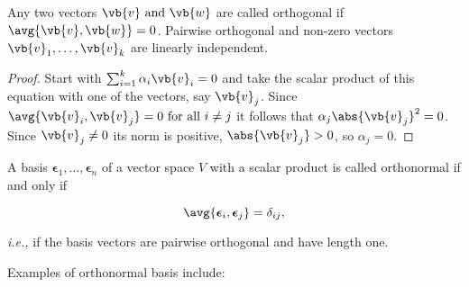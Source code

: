 \documentclass[a4paper,12pt]{report}
\begin{document}
\begin{lemma}
Any two vectors \(\vb{v} \text { and } \vb{w} \) are called orthogonal if \(\avg{\vb{v} ,\vb{w} } = 0\). Pairwise orthogonal and non-zero vectors \(\vb{v} _{1}, \hdots , \vb{v} _{k}  \) are linearly independent.  
\end{lemma}

\begin{proof}
Start with \(\sum_{i=1}^{k} \alpha _{i}\vb{v} _{i} = 0 \) and take the scalar product of this equation with one of the vectors, say \(\vb{v} _{j} \). Since \(\avg{\vb{v} _{i} , \vb{v} _{j} } = 0 \text{ for all } i \neq j\) it follows that \(\alpha _{j}\abs{\vb{v} _{j} }^2 = 0  \). Since \(\vb{v} _{j} \neq 0 \) its norm is positive, \(\abs{\vb{v} _{j} } > 0 \), so \(\alpha _{j} = 0 \).       

\end{proof}

\begin{definition}
A basis \(\boldsymbol{\epsilon  }_{1} , \ldots   , \boldsymbol{\epsilon}_{n}    \) of a vector space \(V\) with a scalar product is called orthonormal if and only if

\begin{equation}
    \avg{\boldsymbol{\epsilon }_{i} , \boldsymbol{\epsilon } _{j}   } = \delta _{ij},
\end{equation}

\textit{i.e.,} if the basis vectors are pairwise orthogonal and have length one.

\end{definition}

Examples of orthonormal basis include:
\end{document}
